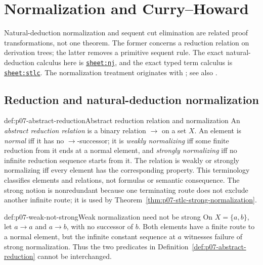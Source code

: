 
\chapter{Normalization and Curry--Howard}
\label{sec:p07-normalization-and-curry-howard}

Natural-deduction normalization and sequent cut elimination are related proof
transformations, not one theorem.  The former concerns a reduction relation
on derivation trees; the latter removes a primitive sequent rule.  The exact
natural-deduction calculus here is
\hyperref[sheet:nj]{\texttt{sheet:nj}}, and the exact typed term calculus is
\hyperref[sheet:stlc]{\texttt{sheet:stlc}}.  The normalization treatment
originates with \cite{Prawitz1965}; see also
\cite{TroelstraSchwichtenberg2000}.

\section{Reduction and natural-deduction normalization}

\begin{hbdefinition}{def:p07-abstract-reduction}{Abstract reduction relation and normalization}
An \emph{abstract reduction relation} is a binary relation
\(\longrightarrow\) on a set \(X\).  An element is \emph{normal} iff it has no
\(\longrightarrow\)-successor; it is \emph{weakly normalizing} iff some
finite reduction from it ends at a normal element, and \emph{strongly
normalizing} iff no infinite reduction sequence starts from it.  The relation
is weakly or strongly normalizing iff every element has the corresponding
property.  This terminology classifies elements and relations, not formulas
or semantic consequence.  The strong notion is nonredundant because one
terminating route does not exclude another infinite route; it is used by
Theorem~\ref{thm:p07-stlc-strong-normalization}.
\end{hbdefinition}

\begin{hbexample}{def:p07-weak-not-strong}{Weak normalization need not be strong}
On \(X=\{a,b\}\), let \(a\longrightarrow a\) and
\(a\longrightarrow b\), with no successor of \(b\).  Both elements have a
finite route to a normal element, but the infinite constant sequence at
\(a\) witnesses failure of strong normalization.  Thus the two predicates
in Definition~\ref{def:p07-abstract-reduction} cannot be interchanged.
\end{hbexample}

